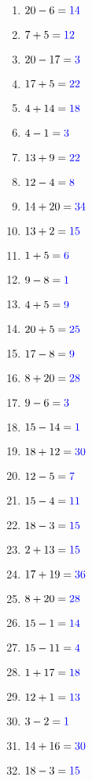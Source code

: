 \documentclass[11pt]{article}\usepackage[a4paper,margin=0.90in,tmargin=0.5in]{geometry}\usepackage{amsmath, amsthm, amssymb}
\begin{document}
\begin{multicols}{4}
\begin{enumerate}[itemsep=0.45\baselineskip]
\item $20 - 6 = { \color[rgb]{0,0,1} 14 }$ 
\item $7 + 5 = { \color[rgb]{0,0,1} 12 }$ 
\item $20 - 17 = { \color[rgb]{0,0,1} 3 }$ 
\item $17 + 5 = { \color[rgb]{0,0,1} 22 }$ 
\item $4 + 14 = { \color[rgb]{0,0,1} 18 }$ 
\item $4 - 1 = { \color[rgb]{0,0,1} 3 }$ 
\item $13 + 9 = { \color[rgb]{0,0,1} 22 }$ 
\item $12 - 4 = { \color[rgb]{0,0,1} 8 }$ 
\item $14 + 20 = { \color[rgb]{0,0,1} 34 }$ 
\item $13 + 2 = { \color[rgb]{0,0,1} 15 }$ 
\item $1 + 5 = { \color[rgb]{0,0,1} 6 }$ 
\item $9 - 8 = { \color[rgb]{0,0,1} 1 }$ 
\item $4 + 5 = { \color[rgb]{0,0,1} 9 }$ 
\item $20 + 5 = { \color[rgb]{0,0,1} 25 }$ 
\item $17 - 8 = { \color[rgb]{0,0,1} 9 }$ 
\item $8 + 20 = { \color[rgb]{0,0,1} 28 }$ 
\item $9 - 6 = { \color[rgb]{0,0,1} 3 }$ 
\item $15 - 14 = { \color[rgb]{0,0,1} 1 }$ 
\item $18 + 12 = { \color[rgb]{0,0,1} 30 }$ 
\item $12 - 5 = { \color[rgb]{0,0,1} 7 }$ 
\item $15 - 4 = { \color[rgb]{0,0,1} 11 }$ 
\item $18 - 3 = { \color[rgb]{0,0,1} 15 }$ 
\item $2 + 13 = { \color[rgb]{0,0,1} 15 }$ 
\item $17 + 19 = { \color[rgb]{0,0,1} 36 }$ 
\item $8 + 20 = { \color[rgb]{0,0,1} 28 }$ 
\item $15 - 1 = { \color[rgb]{0,0,1} 14 }$ 
\item $15 - 11 = { \color[rgb]{0,0,1} 4 }$ 
\item $1 + 17 = { \color[rgb]{0,0,1} 18 }$ 
\item $12 + 1 = { \color[rgb]{0,0,1} 13 }$ 
\item $3 - 2 = { \color[rgb]{0,0,1} 1 }$ 
\item $14 + 16 = { \color[rgb]{0,0,1} 30 }$ 
\item $18 - 3 = { \color[rgb]{0,0,1} 15 }$ 

\end{enumerate}
\end{multicols}
\end{document}
